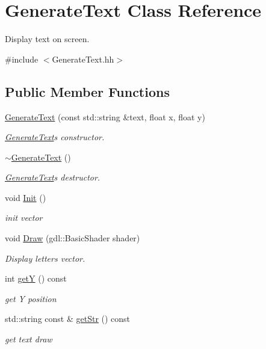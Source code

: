 \hypertarget{class_generate_text}{}\section{Generate\+Text Class Reference}
\label{class_generate_text}


Display text on screen.  




{\ttfamily \#include $<$Generate\+Text.\+hh$>$}

\subsection*{Public Member Functions}
\begin{DoxyCompactItemize}
\item 
\hyperlink{class_generate_text_a7ebb2297410b61c7dd02755087d268b4}{Generate\+Text} (const std\+::string \&text, float x, float y)
\begin{DoxyCompactList}\small\item\em \hyperlink{class_generate_text}{Generate\+Text}\textquotesingle{}s constructor. \end{DoxyCompactList}\item 
\hyperlink{class_generate_text_ae4a9ecffdb0ecc45093a8a95f2d341e4}{$\sim$\+Generate\+Text} ()
\begin{DoxyCompactList}\small\item\em \hyperlink{class_generate_text}{Generate\+Text}\textquotesingle{}s destructor. \end{DoxyCompactList}\item 
void \hyperlink{class_generate_text_aaea83dde4387ef9ee6563d1b1bae53ea}{Init} ()
\begin{DoxyCompactList}\small\item\em init vector \end{DoxyCompactList}\item 
void \hyperlink{class_generate_text_a9e6d6b6a63f1191506ff051898d077a0}{Draw} (gdl\+::\+Basic\+Shader shader)
\begin{DoxyCompactList}\small\item\em Display letters\textquotesingle{} vector. \end{DoxyCompactList}\item 
int \hyperlink{class_generate_text_a76051f35410c569ca7339636dad0944d}{get\+Y} () const 
\begin{DoxyCompactList}\small\item\em get Y position \end{DoxyCompactList}\item 
std\+::string const \& \hyperlink{class_generate_text_a82a73342739af1610790d9dae5fefb85}{get\+Str} () const 
\begin{DoxyCompactList}\small\item\em get text draw \end{DoxyCompactList}\end{DoxyCompactItemize}
